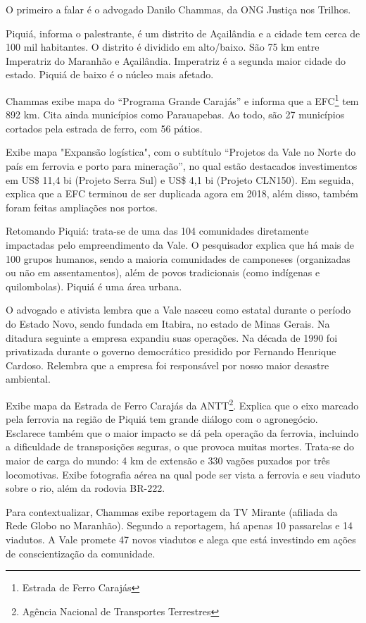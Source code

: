 \documentclass[
article,			%
11pt,				%
oneside,			%
a4paper,			%
english,			%
brazil,				%
sumario=tradicional
]{abntex2}
\begin{document}
	O primeiro a falar é o advogado Danilo Chammas, da ONG Justiça nos Trilhos.
	
	Piquiá, informa o palestrante, é um distrito de Açailândia e a cidade tem cerca de 100 mil habitantes. O distrito é dividido em alto/baixo. São 75 km entre Imperatriz do Maranhão e Açailândia. Imperatriz é a segunda maior cidade do estado. Piquiá de baixo é o núcleo mais afetado.
	
	Chammas exibe mapa do ``Programa Grande Carajás'' e informa que a EFC\footnote{Estrada de Ferro Carajás} tem 892 km. Cita ainda municípios como Parauapebas. Ao todo, são 27 municípios cortados pela estrada de ferro, com 56 pátios.
	
	Exibe mapa "Expansão logística", com o subtítulo ``Projetos da Vale no Norte do país em ferrovia e porto para mineração'', no qual estão destacados investimentos em US\$ 11,4 bi (Projeto Serra Sul) e US\$ 4,1 bi (Projeto CLN150). Em seguida, explica que a EFC terminou de ser duplicada agora em 2018, além disso, também foram feitas ampliações nos portos.
	
	Retomando Piquiá: trata-se de uma das 104 comunidades diretamente impactadas pelo empreendimento da Vale. O pesquisador explica que há mais de 100 grupos humanos, sendo a maioria comunidades de camponeses (organizadas ou não em assentamentos), além de povos tradicionais (como indígenas e quilombolas). Piquiá é uma área urbana.
	
	O advogado e ativista lembra que a Vale nasceu como estatal durante o período do Estado Novo, sendo fundada em Itabira, no estado de Minas Gerais. Na ditadura seguinte a empresa expandiu suas operações. Na década de 1990 foi privatizada durante o governo democrático presidido por Fernando Henrique Cardoso. Relembra que a empresa foi responsável por nosso maior desastre ambiental.
	
	Exibe mapa da Estrada de Ferro Carajás da ANTT\footnote{Agência Nacional de Transportes Terrestres}. Explica que o eixo marcado pela ferrovia na região de Piquiá tem grande diálogo com o agronegócio. Esclarece também que o maior impacto se dá pela operação da ferrovia, incluindo a dificuldade de transposições seguras, o que provoca muitas mortes. Trata-se do maior de carga do mundo: 4 km de extensão e 330 vagões puxados por três locomotivas. Exibe fotografia aérea na qual pode ser vista a ferrovia e seu viaduto sobre o rio, além da rodovia BR-222.
	
	Para contextualizar, Chammas exibe reportagem da TV Mirante (afiliada da Rede Globo no Maranhão). Segundo a reportagem, há apenas 10 passarelas e 14 viadutos. A Vale promete 47 novos viadutos e alega que está investindo em ações de conscientização da comunidade.
	
\end{document}
